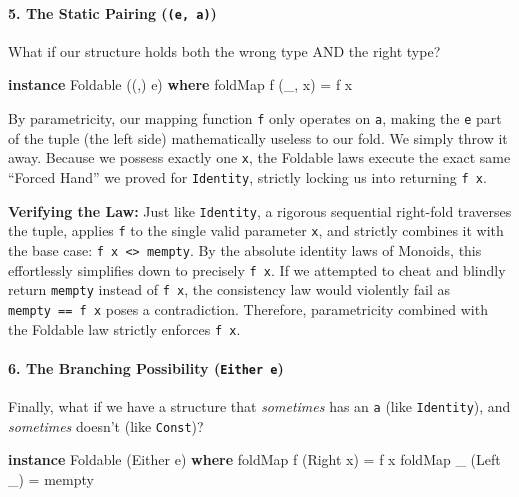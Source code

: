 \documentclass[
]{article}
\newenvironment{Shaded}{}{}
\newcommand{\DataTypeTok}[1]{\textcolor[rgb]{0.56,0.13,0.00}{#1}}
\newcommand{\FunctionTok}[1]{\textcolor[rgb]{0.02,0.16,0.49}{#1}}
\newcommand{\KeywordTok}[1]{\textcolor[rgb]{0.00,0.44,0.13}{\textbf{#1}}}
\newcommand{\NormalTok}[1]{#1}
\newcommand{\OtherTok}[1]{\textcolor[rgb]{0.00,0.44,0.13}{#1}}
\begin{document}
\paragraph{\texorpdfstring{5. The Static Pairing
(\texttt{(e,\ a)})}{5. The Static Pairing ((e, a))}}\label{the-static-pairing-e-a}

What if our structure holds both the wrong type AND the right type?

\begin{Shaded}
\begin{Highlighting}[]
\KeywordTok{instance} \DataTypeTok{Foldable}\NormalTok{ ((,) e) }\KeywordTok{where}
    \FunctionTok{foldMap}\NormalTok{ f (\_, x) }\OtherTok{=}\NormalTok{ f x}
\end{Highlighting}
\end{Shaded}

By parametricity, our mapping function \texttt{f} only operates on
\texttt{a}, making the \texttt{e} part of the tuple (the left side)
mathematically useless to our fold. We simply throw it away. Because we
possess exactly one \texttt{x}, the Foldable laws execute the exact same
``Forced Hand'' we proved for \texttt{Identity}, strictly locking us
into returning \texttt{f\ x}.

\textbf{Verifying the Law:} Just like \texttt{Identity}, a rigorous
sequential right-fold traverses the tuple, applies \texttt{f} to the
single valid parameter \texttt{x}, and strictly combines it with the
base case: \texttt{f\ x\ \textless{}\textgreater{}\ mempty}. By the
absolute identity laws of Monoids, this effortlessly simplifies down to
precisely \texttt{f\ x}. If we attempted to cheat and blindly return
\texttt{mempty} instead of \texttt{f\ x}, the consistency law would
violently fail as \texttt{mempty\ ==\ f\ x} poses a contradiction.
Therefore, parametricity combined with the Foldable law strictly
enforces \texttt{f\ x}.

\paragraph{\texorpdfstring{6. The Branching Possibility
(\texttt{Either\ e})}{6. The Branching Possibility (Either e)}}\label{the-branching-possibility-either-e}

Finally, what if we have a structure that \emph{sometimes} has an
\texttt{a} (like \texttt{Identity}), and \emph{sometimes} doesn't (like
\texttt{Const})?

\begin{Shaded}
\begin{Highlighting}[]
\KeywordTok{instance} \DataTypeTok{Foldable}\NormalTok{ (}\DataTypeTok{Either}\NormalTok{ e) }\KeywordTok{where}
    \FunctionTok{foldMap}\NormalTok{ f (}\DataTypeTok{Right}\NormalTok{ x) }\OtherTok{=}\NormalTok{ f x}
    \FunctionTok{foldMap}\NormalTok{ \_ (}\DataTypeTok{Left}\NormalTok{ \_)  }\OtherTok{=} \FunctionTok{mempty}
\end{Highlighting}
\end{Shaded}
\end{document}
